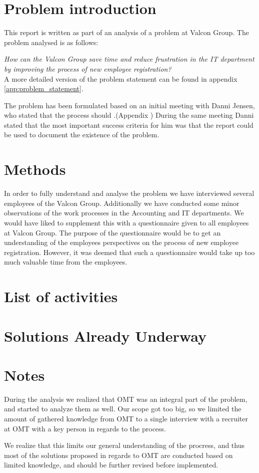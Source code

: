 \section{Problem introduction}
This report is written as part of an analysis of a problem at Valcon Group.
The problem analysed is as follows:

\emph{How can the Valcon Group save time and reduce frustration in the IT department by improving the process of new employee registration?}
\\
A more detailed version of the problem statement can be found in appendix \ref{app:problem_statement}.

The problem has been formulated based on an initial meeting with Danni Jensen, who stated that the process should .(Appendix )
During the same meeting Danni stated that the most important success criteria for him was that the report could be used to document the existence of the problem.

\section{Methods}
In order to fully understand and analyse the problem we have interviewed several employees of the Valcon Group.
Additionally we have conducted some minor observations of the work processes in the Accounting and IT departments.
We would have liked to supplement this with a questionnaire given to all employees at Valcon Group.
The purpose of the questionnaire would be to get an understanding of the employees perspectives on the process of new employee registration.
However, it was deemed that such a questionnaire would take up too much valuable time from the employees.
\section{List of activities}


\section{Solutions Already Underway}


\section{Notes}
During the analysis we realized that OMT was an integral part of the problem, and started to analyze them as well.
Our scope got too big, so we limited the amount of gathered knowledge from OMT to a single interview with a recruiter at OMT with a key person in regards to the process. 

We realize that this limits our general understanding of the procress, and thus most of the solutions proposed in regards to OMT are conducted based on limited knowledge, and should be further revised before implemented. 
